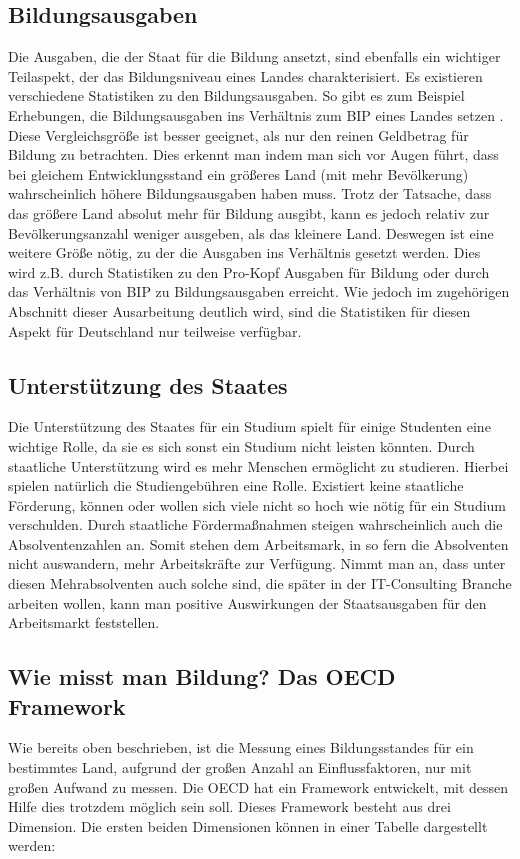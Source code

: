 \subsection*{Bildungsausgaben}
Die Ausgaben, die der Staat für die Bildung ansetzt, sind ebenfalls ein wichtiger Teilaspekt, der das Bildungsniveau eines Landes charakterisiert.
Es existieren verschiedene Statistiken zu den Bildungsausgaben. So gibt es zum Beispiel Erhebungen, die Bildungsausgaben ins Verhältnis zum BIP eines Landes setzen \cite[6]{oecd2} \cite{bip}. Diese Vergleichsgröße ist besser geeignet, als nur den reinen Geldbetrag für Bildung zu betrachten. Dies erkennt man indem man sich vor Augen führt, dass bei gleichem Entwicklungsstand ein größeres Land (mit mehr Bevölkerung) wahrscheinlich höhere Bildungsausgaben haben muss. Trotz der Tatsache,  dass das größere Land absolut mehr für Bildung ausgibt, kann es jedoch relativ zur Bevölkerungsanzahl weniger ausgeben, als das kleinere Land. Deswegen ist eine weitere Größe nötig, zu der die Ausgaben ins Verhältnis gesetzt werden. Dies wird z.B. durch Statistiken zu den Pro-Kopf Ausgaben für Bildung \cite[4]{oecd2} oder durch das Verhältnis von BIP zu Bildungsausgaben erreicht. Wie jedoch im zugehörigen Abschnitt dieser Ausarbeitung deutlich wird, sind die Statistiken für diesen Aspekt für Deutschland nur teilweise verfügbar.

\subsection*{Unterstützung des Staates} 
Die Unterstützung des Staates für ein Studium spielt für einige Studenten eine wichtige Rolle, da sie es sich sonst ein Studium nicht leisten könnten. Durch staatliche Unterstützung wird es mehr Menschen ermöglicht zu studieren. Hierbei spielen natürlich die Studiengebühren eine Rolle. Existiert keine staatliche Förderung, können oder wollen sich viele nicht so hoch wie nötig für ein Studium verschulden. Durch staatliche Fördermaßnahmen steigen wahrscheinlich auch die Absolventenzahlen an. Somit stehen dem Arbeitsmark, in so fern die Absolventen nicht auswandern, mehr Arbeitskräfte zur Verfügung. Nimmt man an, dass unter diesen Mehrabsolventen auch solche sind, die später in der IT-Consulting Branche arbeiten wollen, kann man positive Auswirkungen der Staatsausgaben für den Arbeitsmarkt feststellen.

\subsection*{Wie misst man Bildung? Das OECD Framework}
Wie bereits oben beschrieben, ist die Messung eines Bildungsstandes für ein bestimmtes Land, aufgrund der großen Anzahl an Einflussfaktoren, nur mit großen Aufwand zu messen. Die OECD hat ein Framework entwickelt, mit dessen Hilfe dies trotzdem möglich sein soll. Dieses Framework besteht aus drei Dimension. Die ersten beiden Dimensionen können in einer Tabelle dargestellt werden:

